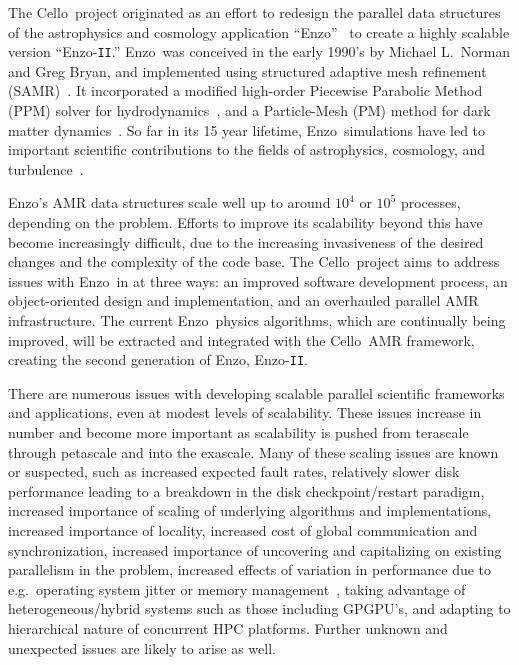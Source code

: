 \documentclass[11pt,letterpaper]{article}
\newcommand{\cello}{\textsf{Cello}}
\newcommand{\enzo}{\textsf{Enzo}}
\newcommand{\enzoii}{\textsf{Enzo}-\texttt{II}}
\begin{document}
The \cello\ project originated as an effort to redesign the parallel
data structures of the astrophysics and cosmology application
``\enzo''~\cite{OsBr04} to create a highly scalable version
``\enzoii.''  \enzo\ was conceived in the early 1990's by Michael
L.~Norman and Greg Bryan, and implemented using structured adaptive
mesh refinement (SAMR)~\cite{BeCo89}.  It incorporated a modified
high-order Piecewise Parabolic Method (PPM) solver for
hydrodynamics~\cite{WoCo84b}, and a Particle-Mesh (PM) method for dark
matter dynamics~\cite{@@@PM}.  So far in its 15 year lifetime, \enzo\
simulations have led to important scientific contributions to the
fields of astrophysics, cosmology, and
turbulence~\cite{@@@enzo-science}.

\enzo's AMR data structures scale well up to around $10^4$ or $10^5$
processes, depending on the problem.  Efforts to improve its
scalability beyond this have become increasingly difficult, due to the
increasing invasiveness of the desired changes and the complexity of
the code base.  The \cello\ project aims to address issues with \enzo\
in at three ways: an improved software development process, an
object-oriented design and implementation, and an overhauled parallel
AMR infrastructure.  The current \enzo\ physics algorithms, which are
continually being improved, will be extracted and integrated with the
\cello\ AMR framework, creating the second generation of \enzo,
\enzoii.

There are numerous issues with developing scalable parallel scientific
frameworks and applications, even at modest levels of scalability.
These issues increase in number and become more important as
scalability is pushed from terascale through petascale and into the
exascale.  Many of these scaling issues are known or suspected, such
as increased expected fault rates, relatively slower disk performance
leading to a breakdown in the disk checkpoint/restart paradigm,
increased importance of scaling of underlying algorithms and
implementations, increased importance of locality, increased cost of
global communication and synchronization, increased importance of
uncovering and capitalizing on existing parallelism in the problem,
increased effects of variation in performance due to e.g.~operating
system jitter or memory management~\cite{StSh09}, taking advantage of
heterogeneous/hybrid systems such as those including GPGPU's, and
adapting to hierarchical nature of concurrent HPC platforms.  Further
unknown and unexpected issues are likely to arise as well.
\end{document}
